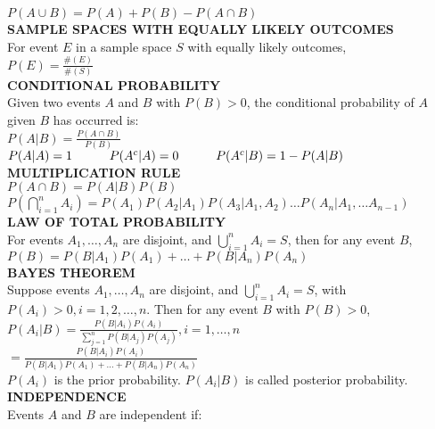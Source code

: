 \documentclass [8pt] {article}
\begin{document}
\begin{multicols*}{2}
\indent $P(A \cup B) = P(A) + P(B) - P(A \cap B)$ \vspace{1mm} \\
\textbf{SAMPLE SPACES WITH EQUALLY LIKELY OUTCOMES} \\
\indent For event $E$ in a sample space $S$ with equally likely outcomes, \\
\indent $P(E) = \frac{\#(E)}{\#(S)} $ \vspace{1mm} \\
\textbf{CONDITIONAL PROBABILITY} \\
\indent Given two events $A$ and $B$ with $P(B) > 0$, the conditional probability of $A$ given $B$ has occurred is: \\
\indent \indent $P(A | B) = \frac{P(A \cap B)}{P(B)}$ \\
\indent \indent $P(A | A) = 1 \\
\indent \indent P(A^c | A) = 0 \\
\indent \indent P(A^c | B) = 1 - P(A|B)$ \vspace{1mm}\\
\textbf{MULTIPLICATION RULE} \\
\indent $P(A \cap B) = P(A | B)P(B)$ \\
\indent $P\left(\bigcap\limits_{i=1}^n A_i\right) = P(A_1)P(A_2|A_1)P(A_3|A_1,A_2)\dots P(A_n|A_1,\dots A_{n-1})$ \\
\textbf{LAW OF TOTAL PROBABILITY} \\
\indent For events $A_1,\dots ,A_n$ are disjoint, and $\bigcup\limits_{i=1}^n A_i = S$, then for any event $B$, \\
\indent $P(B) = P(B|A_1)P(A_1) + \dots + P(B|A_n)P(A_n)$ \\
\textbf{BAYES THEOREM} \\
\indent Suppose events $A_1, \dots, A_n$ are disjoint, and $\bigcup\limits_{i=1}^n A_i = S$, with $P(A_i) > 0, i = 1, 2, \dots, n$. Then for any event $B$ with $P(B) > 0$, \\
\indent $P(A_i|B) = \frac{P(B|A_i)P(A_i)}{\sum\limits_{j=1}^n P(B|A_j)P(A_j)}, i = 1, \dots, n$ \\
\indent \indent \indent \hspace{3mm} $= \frac{P(B|A_i)P(A_i)}{P(B|A_1)P(A_1) + \dots + P(B|A_n)P(A_n)}$ \vspace{2mm}\\
$P(A_i)$ is the prior probability. $P(A_i|B)$ is called posterior probability. \\
\textbf{INDEPENDENCE} \\
\indent Events $A$ and $B$ are independent if: \\

\end{multicols*}
\end{document}
